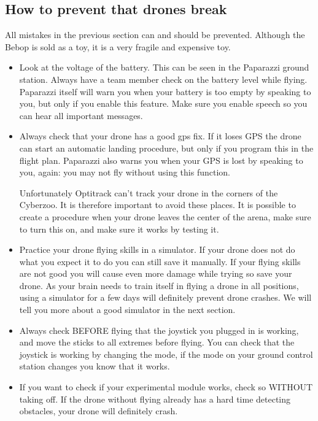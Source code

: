 \documentclass{article}
\begin{document}
\subsection*{How to prevent that drones break }
All mistakes in the previous section can and should be prevented. Although the Bebop is sold as a toy, it is a very fragile and expensive toy. 
\begin{itemize}
\item Look at the voltage of the battery. This can be seen in the Paparazzi ground station. Always have a team member check on the battery level while flying. Paparazzi itself will warn you when your battery is too empty by speaking to you, but only if you enable this feature. Make sure you enable speech so you can hear all important messages.

\item Always check that your drone has a good gps fix. If it loses GPS the drone can start an automatic landing procedure, but only if you program this in the flight plan. Paparazzi also warns you when your GPS is lost by speaking to you, again: you may not fly without using this function. 

Unfortunately Optitrack can't track your drone in the corners of the Cyberzoo. It is therefore important to avoid these places. It is possible to create a procedure when your drone leaves the center of the arena, make sure to turn this on, and make sure it works by testing it. 

\item Practice your drone flying skills in a simulator. If your drone does not do what you expect it to do you can still save it manually. If your flying skills are not good you will cause even more damage while trying so save your drone. As your brain needs to train itself in flying a drone in all positions, using a simulator for a few days will definitely prevent drone crashes. We will tell you more about a good simulator in the next section. 

\item Always check BEFORE flying that the joystick you plugged in is working, and move the sticks to all extremes before flying. You can check that the joystick is working by changing the mode, if the mode on your ground control station changes you know that it works. 
\item If you want to check if your experimental module works, check so WITHOUT taking off. If the drone without flying already has a hard time detecting obstacles, your drone will definitely crash.
\end{itemize}
\end{document}
